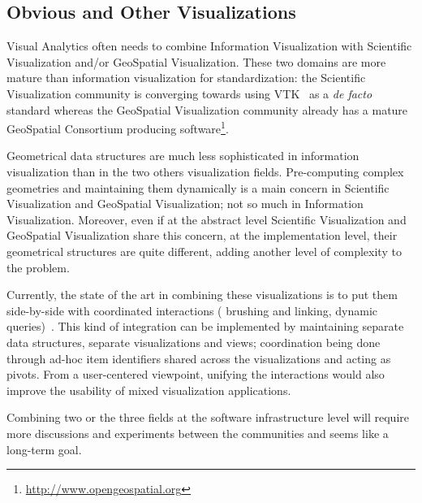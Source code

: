 \begin{comment}
 experiment on various means to carry this
community-driven consensus building, to see how it can help
consolidate acquired experience in the craft of toolkit design.


In many respects, this process is akin to a
standardization process, only it lacks the industry incentive and
backing. Like open source projects, we shall only count on voluntary
contributions (aside partial of funding from public research grants),
only, in the present state of toolkits, it is much more tempting to
devise and expand one's own toolkit than contribute and make
compromise to use a shared design which still lacks serious adoption.


As an afterthought, we find such consolidation effort is rarely found
in research domains, and yet should surely help make the field more
visible and readable from an outsider perspective.
\end{comment}

\subsection{Obvious and Other Visualizations}

Visual Analytics often needs to combine Information Visualization with
Scientific Visualization and/or GeoSpatial Visualization.  These two
domains are more mature than information visualization for
standardization: the Scientific Visualization community is converging
towards using VTK~\cite{VTK} as a \textit{de facto} standard whereas
the GeoSpatial Visualization community already has a mature GeoSpatial
Consortium producing
software\footnote{\url{http://www.opengeospatial.org}}.

Geometrical data structures are much less sophisticated in information
visualization than in the two others visualization fields.
Pre-computing complex geometries and maintaining them dynamically is a
main concern in Scientific Visualization and GeoSpatial Visualization;
not so much in Information Visualization.  Moreover, even if at the
abstract level Scientific Visualization and GeoSpatial Visualization
share this concern, at the implementation level, their geometrical
structures are quite different, adding another level of complexity to
the problem.

Currently, the state of the art in combining these visualizations is
to put them side-by-side with coordinated interactions ( brushing and
linking, dynamic queries)~\cite{Coord3D}.  This kind of integration 
can be implemented by maintaining separate data structures, separate
visualizations and views; coordination being done through ad-hoc item
identifiers shared across the visualizations and acting as pivots.
From a user-centered viewpoint, unifying the interactions would also
improve the usability of mixed visualization applications.

Combining two or the three fields at the software infrastructure
level will require more discussions and experiments between the
communities and seems like a long-term goal.
